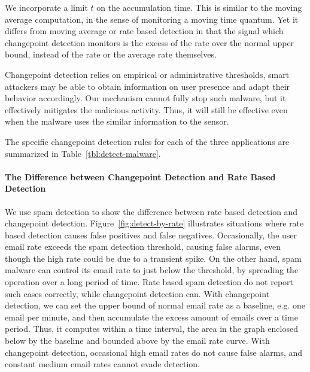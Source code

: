 We incorporate a limit $t$ on the accumulation time.  This is similar to the
moving average computation, in the sense of monitoring a moving time quantum.
Yet it differs from moving average or rate based detection in that the signal
which changepoint detection monitors is the excess of the rate over the normal
upper bound, instead of the rate or the average rate themselves.

Changepoint detection relies on empirical or administrative
thresholds, smart attackers may be able to obtain information on user presence
and adapt their behavior accordingly. Our mechanism cannot fully
stop such malware, but it effectively mitigates the malicious activity.
Thus, it will still be effective even when the malware uses the 
similar information to the sensor.

The specific changepoint detection rules for each of the three applications
are summarized in Table~\ref{tbl:detect-malware}. 

\paragraph{The Difference between Changepoint Detection and 
Rate Based Detection}

We use spam detection to show the difference between rate based
detection and changepoint detection. Figure~\ref{fig:detect-by-rate}
illustrates situations where rate based detection causes false
positives and false negatives. Occasionally, the user email rate
exceeds the spam detection threshold, causing false alarms, even
though the high rate could be due to a transient spike. 
On the other hand, spam malware
can control its email rate to just below the threshold, by spreading
the operation over a long period of time. Rate based spam detection
do not report such cases correctly, while changepoint detection can.
With changepoint detection, we can set the upper bound of normal
email rate as a baseline, e.g. one email per minute, and then accumulate
the excess amount of emails over a time period. Thus, it computes
within a time interval, the area in the graph enclosed below by the
baseline and bounded above by the email rate curve. With changepoint
detection, occasional high email rates do not cause false alarms,
and constant medium email rates cannot evade detection. 
